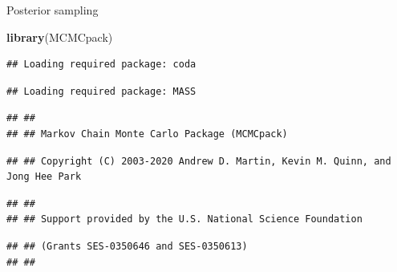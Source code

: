 \documentclass[
  ignorenonframetext,
]{beamer}
\newenvironment{Shaded}{\begin{snugshade}}{\end{snugshade}}
\newcommand{\DataTypeTok}[1]{\textcolor[rgb]{0.13,0.29,0.53}{#1}}
\newcommand{\DecValTok}[1]{\textcolor[rgb]{0.00,0.00,0.81}{#1}}
\newcommand{\FloatTok}[1]{\textcolor[rgb]{0.00,0.00,0.81}{#1}}
\newcommand{\KeywordTok}[1]{\textcolor[rgb]{0.13,0.29,0.53}{\textbf{#1}}}
\newcommand{\NormalTok}[1]{#1}
\newcommand{\OperatorTok}[1]{\textcolor[rgb]{0.81,0.36,0.00}{\textbf{#1}}}
\newcommand{\StringTok}[1]{\textcolor[rgb]{0.31,0.60,0.02}{#1}}
\begin{document}
\begin{frame}[fragile]{Posterior sampling}
\protect\hypertarget{posterior-sampling-1}{}

\begin{Shaded}
\begin{Highlighting}[]
\KeywordTok{library}\NormalTok{(MCMCpack)}
\end{Highlighting}
\end{Shaded}

\begin{verbatim}
## Loading required package: coda
\end{verbatim}

\begin{verbatim}
## Loading required package: MASS
\end{verbatim}

\begin{verbatim}
## ##
## ## Markov Chain Monte Carlo Package (MCMCpack)
\end{verbatim}

\begin{verbatim}
## ## Copyright (C) 2003-2020 Andrew D. Martin, Kevin M. Quinn, and Jong Hee Park
\end{verbatim}

\begin{verbatim}
## ##
## ## Support provided by the U.S. National Science Foundation
\end{verbatim}

\begin{verbatim}
## ## (Grants SES-0350646 and SES-0350613)
## ##
\end{verbatim}

\begin{Shaded}
\end{Shaded}

\end{frame}
\end{document}
